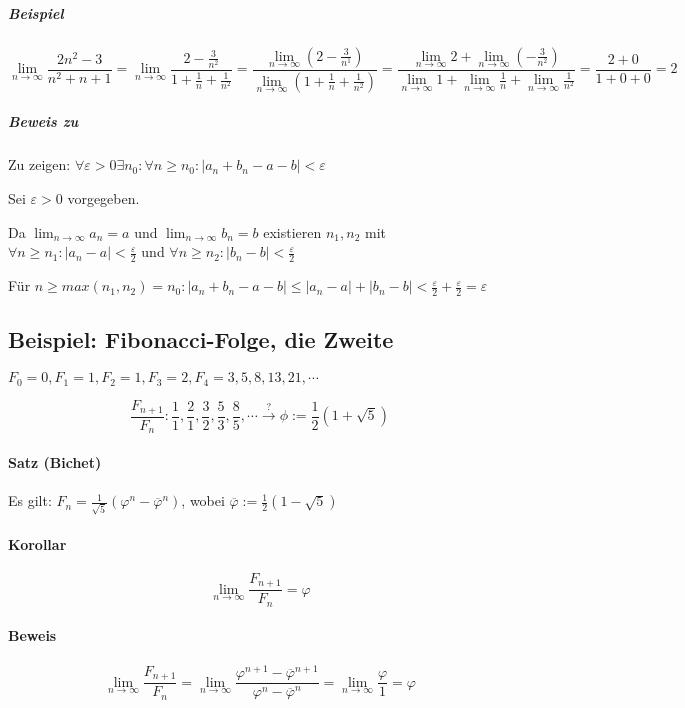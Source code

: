 \documentclass[14pt,a4paper]{article}
\begin{document}
    \subparagraph{Beispiel}
    $$ \lim_{n\to\infty} \frac{2n^2-3}{n^2+n+1} = \lim_{n\to\infty}
    \frac{2 - \frac{3}{n^2}}{1 + \frac{1}{n} + \frac{1}{n^2}} = \frac{
      \lim_{n\to\infty} (2 - \frac{3}{n^1})}{ \lim_{n\to\infty} (1 + \frac{1}{n}
      + \frac{1}{n^2}) } = \frac{\lim_{n\to\infty} 2 + \lim_{n\to\infty} (-
      \frac{3}{n^2})}{\lim_{n\to\infty} 1 + \lim_{n\to\infty} \frac{1}{n} +
      \lim_{n\to\infty} \frac{1}{n^2}} = \frac{2 + 0}{1 + 0 + 0} = 2$$


    \subparagraph{Beweis zu }
    Zu zeigen: $ \forall \varepsilon > 0 \exists n_0 : \forall n \geq n_0 : |a_n
    + b_n - a - b| < \varepsilon $

    Sei $\varepsilon > 0 $ vorgegeben.

    Da $ \lim_{n\to\infty} a_n = a $ und $\lim_{n\to\infty} b_n = b$ existieren
    $n_1, n_2$ mit $ \forall n \geq n_1 : | a_n - a | < \frac{\varepsilon}{2} $
    und $ \forall n \geq n_2 : | b_n - b | < \frac{\varepsilon}{2} $

    Für $ n \geq max(n_1, n_2) = n_0 : |a_n + b_n -a - b | \stackrel{}{\leq} |a_n - a| + |b_n - b| <
    \frac{\varepsilon}{2} + \frac{\varepsilon}{2} = \varepsilon $

    \subsection{Beispiel: Fibonacci-Folge, die Zweite}
    $ F_0 = 0, F_1 = 1, F_2 = 1, F_3 = 2, F_4 = 3, 5, 8, 13, 21, \dotsb $

    $$ \frac{F_{n+1}}{F_n} : \frac{1}{1}, \frac{2}{1}, \frac{3}{2},
    \frac{5}{3}, \frac{8}{5}, \dotsb \stackrel{?}{\to} \phi := \frac{1}{2}(1 +
    \sqrt{5}) $$

    \paragraph{Satz (Bichet)}
    Es gilt: $F_n = \frac{1}{\sqrt{5}} (\varphi^n - \overline{\varphi}^n) $, wobei $
    \overline{\varphi} := \frac{1}{2}(1-\sqrt{5}) $

    \paragraph{Korollar}
    $$ \lim_{n\to\infty} \frac{F_{n+1}}{F_n} = \varphi$$

    \paragraph{Beweis}
    $$ \lim_{n\to\infty} \frac{F_{n+1}}{F_n} = \lim_{n\to\infty}
    \frac{\varphi^{n+1} - \overline{\varphi}^{n+1}}{\varphi^{n} -
      \overline{\varphi}^{n}} = \lim_{n\to\infty} \frac{\varphi}{1} = \varphi$$
\end{document}
